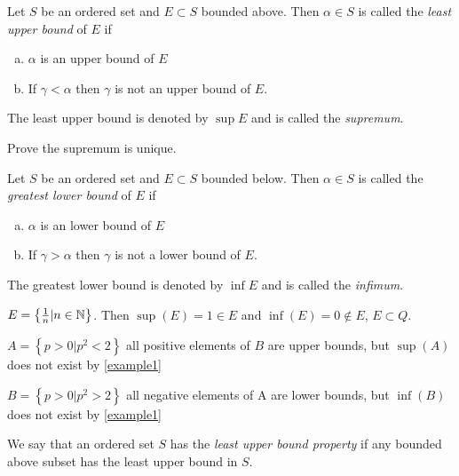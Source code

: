 \begin{definition}
	Let \( S \) be an ordered set and \( E \subset S \) bounded above. 
	Then \( \alpha \in S \) is called the {\em least upper bound} of \( E \) if
	\begin{enumerate}[a.]
		\item \( \alpha \) is an upper bound of \( E \)
		\item If \( \gamma < \alpha \) then \( \gamma \) is not an upper bound of \( E \).
	\end{enumerate}
	The least upper bound is denoted by \( \sup{E} \) and is called the {\em supremum}.
	\label{supremum}
\end{definition}

\begin{exercise}
	Prove the supremum is unique.
\end{exercise}

\begin{definition}
	Let \( S \) be an ordered set and \( E \subset S \) bounded below. 
	Then \( \alpha \in S \) is called the {\em greatest lower bound} of \( E \) if
	\begin{enumerate}[a.]
		\item \( \alpha \) is an lower bound of \( E \)
		\item If \( \gamma > \alpha \) then \( \gamma \) is not a lower bound of \( E \).
	\end{enumerate}
	The greatest lower bound is denoted by \( \inf{E} \) and is called the {\em infimum}.
	\label{infimum}
\end{definition}

\begin{example}
	\( E = \left\{ \frac{1}{n} | n \in \mathbb{N} \right\} \). Then \( \sup(E)=1 \in E \) and \(
	\inf(E)=0 \not \in E \), \( E \subset Q \). 
\end{example}

\begin{example}
	\( A = \left\{ p > 0 | p^2 < 2 \right\} \) all positive elements of \( B \) are upper
	bounds, but \( \sup(A) \) does not exist by \ref{example1}
\end{example}

\begin{example}
	\( B = \left\{ p > 0 | p^2 > 2 \right\} \) all negative elements of A are lower bounds, but
	\( \inf(B) \) does not exist by \ref{example1}
\end{example}

\begin{definition}
	We say that an ordered set \( S \) has the {\em least upper bound property} if any bounded
	above subset has the least upper bound in \( S \).
	\label{LUBprop}
\end{definition}

